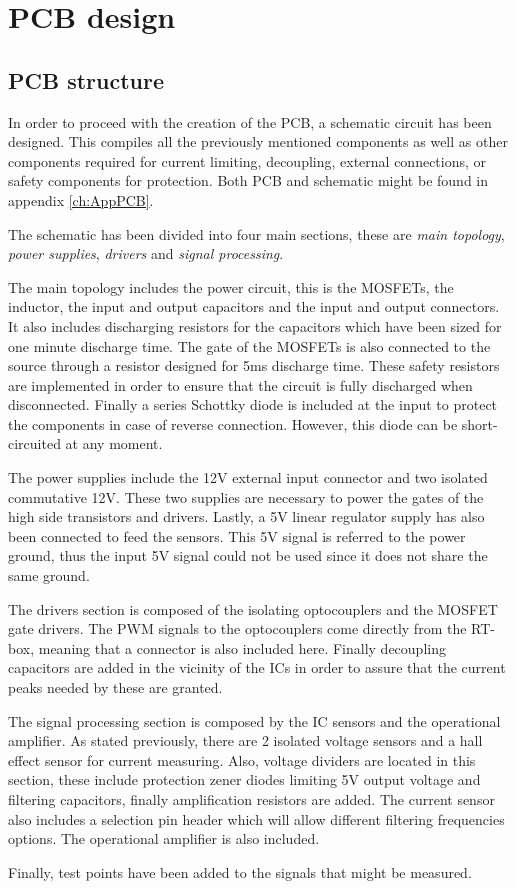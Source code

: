 \section{PCB design}
\subsection{PCB structure} \label{PCB_Schematic}
In order to proceed with the creation of the PCB, a schematic circuit has been designed. This compiles all the previously mentioned components as well as other components required for current limiting, decoupling, external connections, or safety components for protection. Both PCB and schematic might be found in appendix \ref{ch:AppPCB}.

The schematic has been divided into four main sections, these are \textit{main topology}, \textit{power supplies}, \textit{drivers} and \textit{signal processing}.

The main topology includes the power circuit, this is the MOSFETs, the inductor, the input and output capacitors and the input and output connectors. It also includes discharging resistors for the capacitors which have been sized for one minute discharge time. The gate of the MOSFETs is also connected to the source through a resistor designed for 5ms discharge time. These safety resistors are implemented in order to ensure that the circuit is fully discharged when disconnected. Finally a series Schottky diode is included at the input to protect the components in case of reverse connection. However, this diode can be short-circuited at any moment.

The power supplies include the 12V external input connector and two isolated commutative 12V. These two supplies are necessary to power the gates of the high side transistors and drivers. Lastly, a 5V linear regulator supply has also been connected to feed the sensors. This 5V signal is referred to the power ground, thus the input 5V signal could not be used since it does not share the same ground.

The drivers section is composed of the isolating optocouplers and the MOSFET gate drivers. The PWM signals to the optocouplers come directly from the RT-box, meaning that a connector is also included here. Finally decoupling capacitors are added in the vicinity of the ICs in order to assure that the current peaks needed by these are granted.

The signal processing section is composed by the IC sensors and the operational amplifier. As stated previously, there are 2 isolated voltage sensors and a hall effect sensor for current measuring. Also, voltage dividers are located in this section, these include protection zener diodes limiting 5V output voltage and filtering capacitors, finally amplification resistors are added. The current sensor also includes a selection pin header which will allow different filtering frequencies options. The operational amplifier is also included.

Finally, test points have been added to the signals that might be measured.
